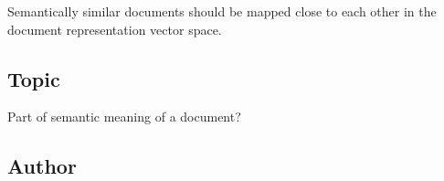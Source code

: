 \begin{repre_prop}\label{repre_prop:similarity-as-proximity}

  Semantically similar documents should be mapped close to each other in the
  document representation vector space.

\end{repre_prop}

\subsection{Topic}

Part of semantic meaning of a document?


\subsection{Author}




